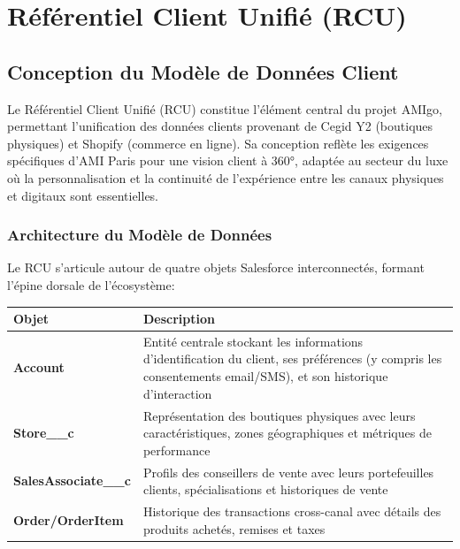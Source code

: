 
\chapter{Référentiel Client Unifié (RCU)}

\section{Conception du Modèle de Données Client}


\begin{mdframed}[style=breakablegreen]
Le Référentiel Client Unifié (RCU) constitue l'élément central du projet AMIgo, permettant l'unification des données clients provenant de Cegid Y2 (boutiques physiques) et Shopify (commerce en ligne). Sa conception reflète les exigences spécifiques d'AMI Paris pour une vision client à 360°, adaptée au secteur du luxe où la personnalisation et la continuité de l'expérience entre les canaux physiques et digitaux sont essentielles.
\end{mdframed}

\subsection{Architecture du Modèle de Données}

Le RCU s'articule autour de quatre objets Salesforce interconnectés, formant l'épine dorsale de l'écosystème:

\begin{center}
\begin{tabular}{|>{\bfseries}p{4cm}|p{9.5cm}|}
\hline
\rowcolor{lightblue} Objet & Description \\
\hline
Account & Entité centrale stockant les informations d'identification du client, ses préférences (y compris les consentements email/SMS), et son historique d'interaction \\
\hline
Store\_\_c & Représentation des boutiques physiques avec leurs caractéristiques, zones géographiques et métriques de performance \\
\hline
SalesAssociate\_\_c & Profils des conseillers de vente avec leurs portefeuilles clients, spécialisations et historiques de vente \\
\hline
Order/OrderItem & Historique des transactions cross-canal avec détails des produits achetés, remises et taxes \\
\hline
\end{tabular}
\end{center}
\newpage

